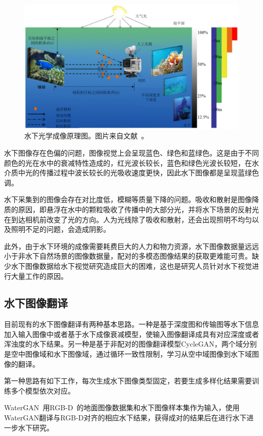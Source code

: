 \begin{figure}[ht]
    \centering
	\includegraphics[width=\textwidth]{figures/水下成像.pdf}
	\caption{水下光学成像原理图。图片来自文献~\cite{2002Vision}。}
	\label{fig:underwater}
\end{figure}

水下图像存在色偏的问题，图像视觉上会呈现蓝色、绿色和蓝绿色。这是由于不同颜色的光在水中的衰减特性造成的，红光波长较长，蓝色和绿色光波长较短，在水介质中光的传播过程中波长较长的光吸收速度更快，因此水下图像都是呈现蓝绿色调。

水下采集到的图像会存在对比度低，模糊等质量下降的问题。吸收和散射是图像降质的原因，即悬浮在水中的颗粒吸收了传播中的大部分光，并将水下场景的反射光在到达相机前改变了光的方向。人为光线除了吸收和散射，还会出现照明不均匀以及照明不足的问题，会造成阴影。

此外，由于水下环境的成像需要耗费巨大的人力和物力资源，水下图像数据量远远小于非水下自然场景的图像数据量，配对的多模态图像结果的获取更难能可贵。缺少水下图像数据给水下视觉研究造成巨大的困难，这也是研究人员针对水下视觉进行大量工作的原因。

\subsection{水下图像翻译}
目前现有的水下图像翻译有两种基本思路。一种是基于深度图和传输图等水下信息加入输入图像中或者基于水下成像衰减模型，使输入图像翻译成具有对应深度或者浑浊度的水下结果。另一种是基于非配对的图像翻译模型CycleGAN，两个域分别是空中图像域和水下图像域，通过循环一致性限制，学习从空中域图像到水下域图像的翻译。

第一种思路有如下工作，每次生成水下图像类型固定，若要生成多样化结果需要训练多个模型依次对应。

WaterGAN~\cite{li2017watergan}用RGB-D~\cite{janoch2013category,lai2014unsupervised,silberman2011indoor,shotton2013scene}的地面图像数据集和水下图像样本集作为输入，使用WaterGAN翻译与RGB-D对齐的相应水下结果，获得成对的结果后在进行水下进一步水下研究。

